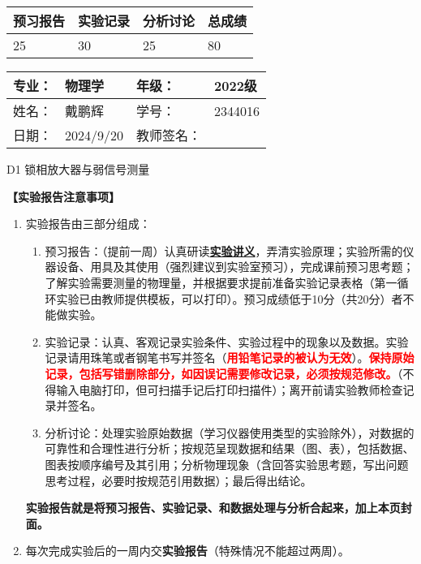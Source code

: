 \documentclass[dvipsnames, svgnames,a4paper,11pt]{article}
\begin{document}
\begin{table}
	\renewcommand\arraystretch{1.7}
	\begin{tabularx}{\textwidth}{
		|X|X|X|X
		|X|X|X|X|}
	\hline
	\multicolumn{2}{|c|}{预习报告}&\multicolumn{2}{|c|}{实验记录}&\multicolumn{2}{|c|}{分析讨论}&\multicolumn{2}{|c|}{总成绩}\\
	\hline
	\LARGE25 & & \LARGE30 & & \LARGE25 & & \LARGE80 & \\
	\hline
	\end{tabularx}
\end{table}


\begin{table}
	\renewcommand\arraystretch{1.7}
	\begin{tabularx}{\textwidth}{|X|X|X|X|}
	\hline
	专业：& 物理学 &年级：& 2022级\\
	\hline
	姓名：& 戴鹏辉  & 学号： & 2344016 \\
	\hline
	日期：& 2024/9/20 & 教师签名：& \\
	\hline
	\end{tabularx}
\end{table}

\begin{center}
	\LARGE D1 \quad 锁相放大器与弱信号测量
\end{center}

\textbf{【实验报告注意事项】}
\begin{enumerate}
	\item 实验报告由三部分组成：
	\begin{enumerate}
		\item 预习报告：（提前一周）认真研读\underline{\textbf{实验讲义}}，弄清实验原理；实验所需的仪器设备、用具及其使用（强烈建议到实验室预习），完成课前预习思考题；了解实验需要测量的物理量，并根据要求提前准备实验记录表格（第一循环实验已由教师提供模板，可以打印）。预习成绩低于10分（共20分）者不能做实验。
	    \item 实验记录：认真、客观记录实验条件、实验过程中的现象以及数据。实验记录请用珠笔或者钢笔书写并签名（\textcolor{red}{\textbf{用铅笔记录的被认为无效}}）。\textcolor{red}{\textbf{保持原始记录，包括写错删除部分，如因误记需要修改记录，必须按规范修改。}}（不得输入电脑打印，但可扫描手记后打印扫描件）；离开前请实验教师检查记录并签名。
	    \item 分析讨论：处理实验原始数据（学习仪器使用类型的实验除外），对数据的可靠性和合理性进行分析；按规范呈现数据和结果（图、表），包括数据、图表按顺序编号及其引用；分析物理现象（含回答实验思考题，写出问题思考过程，必要时按规范引用数据）；最后得出结论。
	\end{enumerate}
	\textbf{实验报告就是将预习报告、实验记录、和数据处理与分析合起来，加上本页封面。}
	\item 每次完成实验后的一周内交\textbf{实验报告}（特殊情况不能超过两周）。
\end{enumerate}
\end{document}
